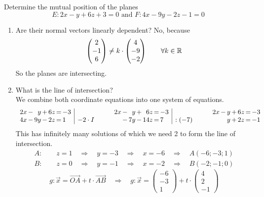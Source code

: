 \documentclass[12pt,eng]{skript_ogg}
\begin{document}
\begin{beispiel}
Determine the mutual position of the planes
\[E:2x-y+6z+3=0\text{ and }F:4x-9y-2z-1=0\]
\begin{enumerate}
	\item Are their normal vectors linearly dependent? No, because
	\[\begin{pmatrix}2\\-1\\6\end{pmatrix}\neq k\cdot\begin{pmatrix}4\\-9\\-2\end{pmatrix}\qquad\forall k\in\mathbb{R}\]
	So the planes are intersecting.
	\item What is the line of intersection?\\
	We combine both coordinate equations into one system of equations.
\[\begin{array}{r@{\,}c@{\,}r@{\,}c@{\,}r@{\,}c@{\,}l|l}
2x & - & y  & + & 6z & = & -3 & \\
4x & - & 9y & - & 2z & = & 1 & -2\cdot I
\end{array}\quad\quad\begin{array}{r@{\,}c@{\,}r@{\,}c@{\,}r@{\,}c@{\,}l|l}
2x & - & y  & + & 6z  & = & -3 & \\
   & - & 7y & - & 14z & = & 7  & :(-7)
\end{array}\quad\quad\begin{array}{r@{\,}c@{\,}r@{\,}c@{\,}r@{\,}c@{\,}l}
2x & - & y & + & 6z & = & -3 \\
   &   & y & + & 2z & = & -1  
		\end{array}\]
This has infinitely many solutions of which we need 2 to form the line of intersection.
	\[\begin{array}{l}
	A:\qquad z=1\quad\Rightarrow\quad y=-3\quad\Rightarrow\quad x=-6\quad\Rightarrow\quad A(-6;-3;1)\\
	B:\qquad z=0\quad\Rightarrow\quad y=-1\quad\Rightarrow\quad x=-2\quad\Rightarrow\quad B(-2;-1;0)
	\end{array}\]
	\[g:\vec{x}=\overrightarrow{OA}+t\cdot\overrightarrow{AB}\quad\Rightarrow\quad g:\vec{x}=\begin{pmatrix}-6\\-3\\1\end{pmatrix}+t\cdot \begin{pmatrix}4\\2\\-1\end{pmatrix}\]
\end{enumerate}
\end{beispiel}
\end{document}
